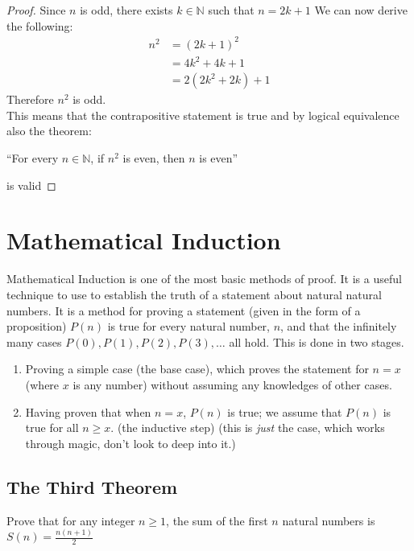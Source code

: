 \begin{proof}
Since $n$ is odd, there exists $k \in \mathbb{N}$ such that $n=2k+1$ We can now derive the following:
\begin{align*}
    n^2 &= (2k+1)^2\\
    &= 4k^2 + 4k + 1\\
    &= 2(2k^2+2k) + 1
\end{align*}
Therefore $n^2$ is odd.\\

This means that the contrapositive statement is true and by logical equivalence also the theorem:
\begin{center}
    ``For every $n \in \mathbb{N}$, if $n^2$ is even, then $n$ is even''
\end{center}
is valid
\end{proof}

\section{Mathematical Induction}
Mathematical Induction is one of the most basic methods of proof. It is a useful technique to use to establish the truth of a statement about natural natural numbers. It is a method for proving a statement (given in the form of a proposition) $P(n)$ is true for every natural number, $n$, and that the infinitely many cases $P(0), P(1), P(2), P(3), \ldots$ all hold. This is done in two stages.
\begin{enumerate}
    \item Proving a simple case (the base case), which proves the statement for $n=x$ (where $x$ is any number) without assuming any knowledges of other cases.
    \item Having proven that when $n=x$, $P(n)$ is true; we assume that $P(n)$ is true for all $n\geq x$. (the inductive step) (this is \textit{just} the case, which works through magic, don't look to deep into it.)
\end{enumerate}

\subsection{The Third Theorem}
\begin{theorem}
    Prove that for any integer $n \geq 1$, the sum of the first $n$ natural numbers is $\displaystyle S(n) = \frac{n(n+1)}{2}$
\end{theorem}

